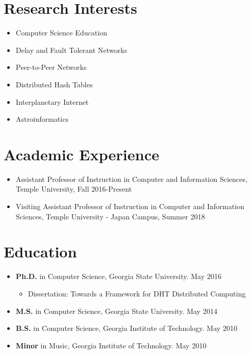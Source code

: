 \documentclass{res}
\begin{document}
\begin{resume} 

\section{Research Interests}
	\begin{itemize}
	\item Computer Science Education
    \item Delay and Fault Tolerant Networks
    \item Peer-to-Peer Networks
	\item Distributed Hash Tables
	\item Interplanetary Internet 
	\item Astroinformatics
	
	\end{itemize}

\section{Academic Experience}
\begin{itemize}
	\item  Assistant Professor of Instruction in Computer and Information Sciences, Temple University, Fall 2016-Present
	\item  Visiting Assistant Professor of Instruction in Computer and Information Sciences, Temple University - Japan Campus, Summer 2018
	
\end{itemize}

\section{Education}          
    \begin{itemize}    
    \item {\bf Ph.D.} in Computer Science, Georgia State University. May 2016
    \begin{itemize}
    	\item Dissertation: Towards a Framework for DHT Distributed Computing
    \end{itemize}
    \item {\bf M.S.} in Computer Science, Georgia State University. May 2014 
    \item {\bf B.S.} in Computer Science, Georgia Institute of Technology. May 2010
	\item {\bf Minor} in Music, Georgia Institute of Technology. May 2010
    

\end{itemize}
\end{resume}
\end{document}
